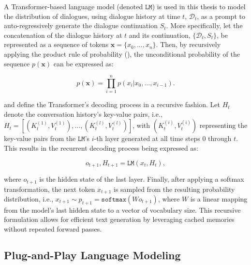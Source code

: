 A Transformer-based language model (denoted $\texttt{LM}$) is used in this thesis to model the distribution of dialogues, using dialogue history at time $t$, $\mathcal{D}_t$, as a prompt to auto-regressively generate the dialogue continuation $S_t$. More specifically, let the concatenation of the dialogue history at $t$ and its continuation, $\{\mathcal{D}_t, S_t\}$, be represented as a sequence of tokens $\textbf{x}= \{x_0, ..., x_n\}$. Then, by recursively applying the product rule of probability (\cite{bishop2006pattern}), the unconditional probability of the sequence $p(\textbf{x})$ can be expressed as:

\begin{equation}
    p(\textbf{x}) = \prod_{i = 1}^n p(x_i | x_0, ..., x_{i - 1}).
\end{equation}

\cite{dathathri2019plug} and \cite{madotto-etal-2020-plug} define the Transformer's decoding process in a recursive fashion. Let $H_t$ denote the conversation history's key-value pairs, i.e., $H_t = \left[ (K_t^{(1)}, V_t^{(1)}), ..., (K_t^{(l)}, V_t^{(l)}) \right]$, with $(K_t^{(i)}, V_t^{(i)})$ representing the key-value pairs from the $\texttt{LM}$'s $i$-th layer generated at all time steps $0$ through $t$. This results in the recurrent decoding process being expressed as:

\begin{equation}
    o_{t + 1}, H_{t + 1} = \texttt{LM} \left( x_t, H_t \right),
\label{eq:transformer_lm_io}
\end{equation}

where $o_{t + 1}$ is the hidden state of the last layer. Finally, after applying a softmax transformation, the next token $x_{t + 1}$ is sampled from the resulting probability distribution, i.e.,  $x_{t + 1} \sim p_{t + 1} = \texttt{softmax} \left( W o_{t + 1} \right)$, where $W$ is a linear mapping from the model's last hidden state to a vector of vocabulary size. This recursive formulation allows for efficient text generation by leveraging cached memories without repeated forward passes.

\subsection{Plug-and-Play Language Modeling}
\label{sec:ppm}


